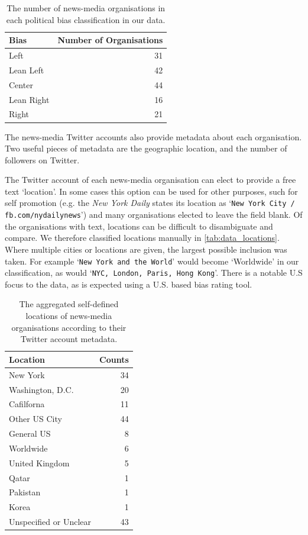 \begin{table}[!htbp]
	\centering
	\begin{tabular}{lr}
		\toprule
		Bias &   Number of Organisations \\
		\midrule
		{\color{Left} Left }&  31 \\
		{\color{LeanLeft} Lean Left }&  42 \\
		{\color{Center} Center }&  44 \\
		{\color{LeanRight} Lean Right }&  16 \\
		{\color{Right} Right }&  21 \\
		\bottomrule
	\end{tabular}
	\caption{The number of news-media organisations in each political bias classification in our data.}
	\label{fig:data_number_of_bias_organisations}
\end{table}

The news-media Twitter accounts also provide metadata about each organisation. Two useful pieces of metadata are the geographic location, and the number of followers on Twitter.

The Twitter account of each news-media organisation can elect to provide a free text `location'. In some cases this option can be used for other purposes, such for self promotion (e.g. the \emph{New York Daily} states its location as `\texttt{New York City  /  fb.com/nydailynews}') and many organisations elected to leave the field blank. 
Of the organisations with text, locations can be difficult to disambiguate and compare. We therefore classified locations manually in \autoref{tab:data_locations}. Where multiple cities or locations are given, the largest possible inclusion was taken. For example `\texttt{New York and the World}' would become `Worldwide' in our classification, as would `\texttt{NYC, London, Paris, Hong Kong}'. There is a notable U.S focus to the data, as is expected using a U.S. based bias rating tool.

\begin{table}[!htbp]
	\centering
	\begin{tabular}{lr}
		\toprule
		Location &  Counts \\
		\midrule
		New York &      34 \\
		Washington, D.C. &      20 \\
		Cafilforna &      11 \\
		Other US City &      44 \\
		General US &       8 \\
		Worldwide &       6 \\
		United Kingdom &       5 \\
		Qatar &       1 \\
		Pakistan &       1 \\
		Korea  &       1 \\
		Unspecified or Unclear &      43 \\
		\bottomrule
	\end{tabular}
	\caption{The aggregated self-defined locations of news-media organisations according to their Twitter account metadata. }
	\label{tab:data_locations}
\end{table}

